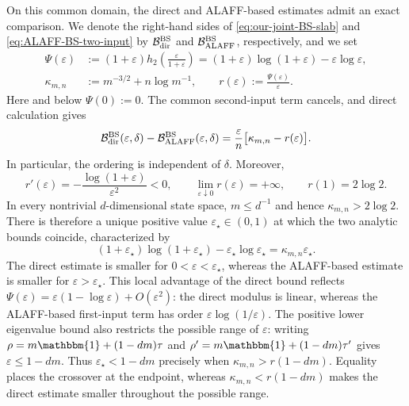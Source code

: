 \documentclass[11pt]{article}
\theoremstyle{remark}
\newcommand{\1}{\mathbbm{1}}
\begin{document}
On this common domain, the direct and ALAFF-based estimates admit an
exact comparison.  We denote the right-hand sides of
\eqref{eq:our-joint-BS-slab} and \eqref{eq:ALAFF-BS-two-input} by
$\mathcal B_{\rm dir}^{\rm BS}$ and
$\mathcal B_{\rm ALAFF}^{\rm BS}$, respectively, and we set
\begin{equation}
 \begin{aligned}
 \Psi(\varepsilon)
 &:= (1+\varepsilon)
 h_2\!\left(\frac{\varepsilon}{1+\varepsilon}\right)
  =(1+\varepsilon)\log(1+\varepsilon)
    -\varepsilon\log\varepsilon,\\
 \kappa_{m,n}&:=m^{-3/2}+n\log m^{-1},
 \qquad
 r(\varepsilon):=\frac{\Psi(\varepsilon)}{\varepsilon}.
 \end{aligned}
 \label{eq:BS-comparison-functions}
\end{equation}
Here and below $\Psi(0):=0$.  The common second-input term cancels,
and direct calculation gives
\begin{equation}
 \mathcal B_{\rm dir}^{\rm BS}(\varepsilon,\delta)
 -\mathcal B_{\rm ALAFF}^{\rm BS}(\varepsilon,\delta)
 =\frac{\varepsilon}{n}\bigl[\kappa_{m,n}-r(\varepsilon)\bigr].
 \label{eq:BS-direct-ALAFF-difference}
\end{equation}
In particular, the ordering is independent of $\delta$.  Moreover,
\begin{equation}
 r'(\varepsilon)
 =-\frac{\log(1+\varepsilon)}{\varepsilon^2}<0,
 \qquad
 \lim_{\varepsilon\downarrow0}r(\varepsilon)=+\infty,
 \qquad
 r(1)=2\log2.
 \label{eq:BS-comparison-r-monotonicity}
\end{equation}
In every nontrivial $d$-dimensional state space, $m\leq d^{-1}$ and
hence $\kappa_{m,n}>2\log2$.  There is therefore a unique positive
value $\varepsilon_\star\in(0,1)$ at which the two analytic bounds
coincide, characterized by
\begin{equation}
 (1+\varepsilon_\star)\log(1+\varepsilon_\star)
 -\varepsilon_\star\log\varepsilon_\star
 =\kappa_{m,n}\varepsilon_\star.
 \label{eq:BS-CB-crossover}
\end{equation}
The direct estimate is smaller for
$0<\varepsilon<\varepsilon_\star$, whereas the ALAFF-based estimate
is smaller for $\varepsilon>\varepsilon_\star$.  This local advantage
of the direct bound reflects
$\Psi(\varepsilon)=\varepsilon(1-\log\varepsilon)+O(\varepsilon^2)$:
the direct modulus is linear, whereas the ALAFF-based first-input term
has order $\varepsilon\log(1/\varepsilon)$.
The positive lower
eigenvalue bound also restricts the possible range of $\varepsilon$:
writing
$\rho=m\1+(1-dm)\tau$ and
$\rho'=m\1+(1-dm)\tau'$ gives
$\varepsilon\leq1-dm$.  Thus $\varepsilon_\star<1-dm$ precisely when
$\kappa_{m,n}>r(1-dm)$.  Equality places
the crossover at the endpoint, whereas
$\kappa_{m,n}<r(1-dm)$ makes the direct estimate smaller throughout
the possible range.
\end{document}
